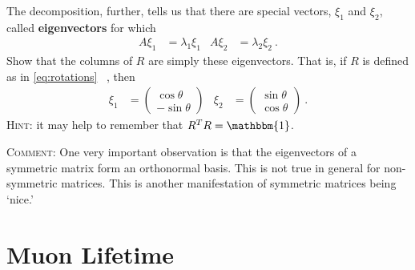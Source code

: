 \documentclass[12pt]{article}
\numberwithin{equation}{section}    %
\begin{document}
The decomposition, further, tells us that there are special vectors, $\xi_1$ and $\xi_2$, called \textbf{eigenvectors} for which 
\begin{align}
	A \xi_1 &= \lambda_1\xi_1
	&
	A \xi_2 &= \lambda_2\xi_2 \ .
\end{align}
Show that the columns of $R$ are simply these eigenvectors. That is, if $R$ is defined as in \eqref{eq:rotations} \ , then 
\begin{align}
	\xi_1 &= 
	\begin{pmatrix}
		\cos\theta\\ -\sin\theta
	\end{pmatrix}
	&
	\xi_2 &= 
	\begin{pmatrix}
		\sin\theta\\ \cos\theta
	\end{pmatrix} \ .
\end{align}
\textsc{Hint:} it may help to remember that $R^T R = \mathbbm{1}$. 

\textsc{Comment:} One very important observation is that the eigenvectors of a symmetric matrix form an orthonormal basis. This is not true in general for non-symmetric matrices. This is another manifestation of symmetric matrices being `nice.'

\section{Muon Lifetime}
\end{document}
